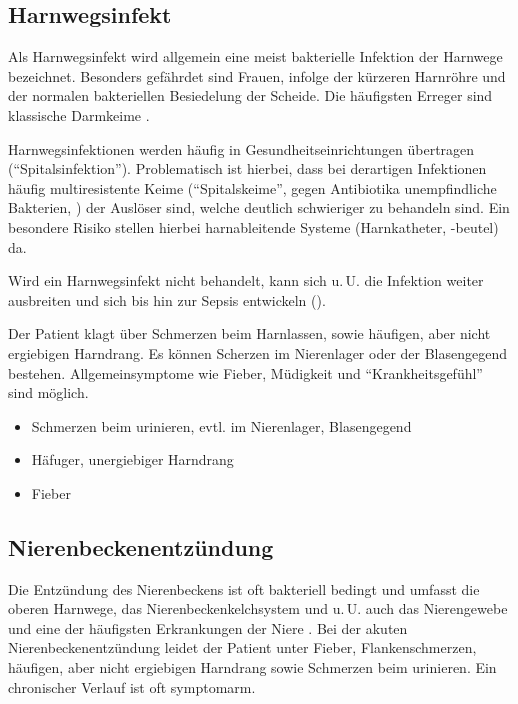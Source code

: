 \subsection{Harnwegsinfekt}
\label{topic:harnwegsinfekt}



{Als Harnwegsinfekt wird allgemein eine meist bakterielle
Infektion der Harnwege bezeichnet. Besonders gefährdet sind
Frauen, infolge der kürzeren Harnröhre und der
normalen bakteriellen Besiedelung der Scheide. Die
häufigsten Erreger sind klassische Darmkeime .

Harnwegsinfektionen werden häufig in
Gesundheitseinrichtungen übertragen (\enquote{Spitalsinfektion}).
Problematisch ist hierbei, dass bei derartigen Infektionen
häufig multiresistente Keime (\enquote{Spitalskeime},
gegen Antibiotika unempfindliche Bakterien,
) der Auslöser
sind, welche deutlich schwieriger zu behandeln sind. Ein
besondere Risiko stellen hierbei harnableitende Systeme
(Harnkatheter, -beutel) da.

Wird ein Harnwegsinfekt nicht behandelt, kann sich u.\,U.
die Infektion weiter ausbreiten und sich bis hin zur Sepsis
entwickeln ().

}
{}
{}
{}
{}



{Der Patient klagt über Schmerzen beim Harnlassen, sowie
häufigen, aber nicht ergiebigen Harndrang. Es können
Scherzen im Nierenlager oder der Blasengegend bestehen.
Allgemeinsymptome wie Fieber, Müdigkeit und
\enquote{Krankheitsgefühl} sind möglich. 

}
{
\begin{itemize}
  \item Schmerzen beim urinieren, evtl. im Nierenlager,
  Blasengegend
  \item Häfuger, unergiebiger Harndrang
  \item Fieber
\end{itemize}}
{}
{}
{}


\subsection{Nierenbeckenentzündung}
\label{topic:nierenbeckenentzuendung}


Die Entzündung des Nierenbeckens ist oft bakteriell bedingt 
und umfasst die oberen Harnwege, das Nierenbeckenkelchsystem
und u.\,U. auch das Nierengewebe und eine der häufigsten
Erkrankungen der Niere \cite{Pschy259}. Bei der akuten
Nierenbeckenentzündung leidet der Patient unter Fieber, Flankenschmerzen, häufigen, aber nicht ergiebigen
Harndrang sowie Schmerzen beim urinieren. Ein chronischer
Verlauf ist oft symptomarm.



